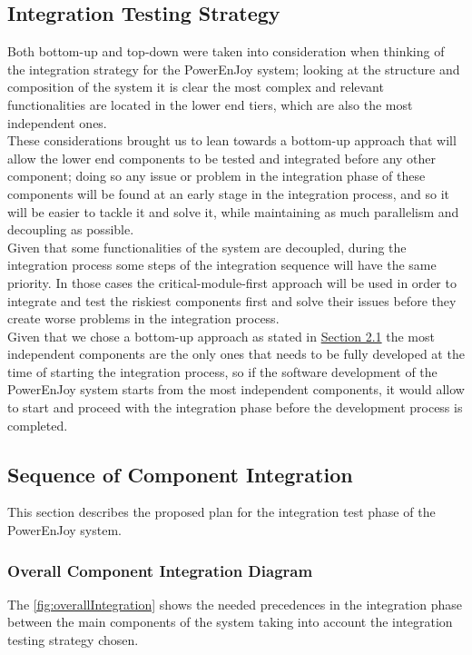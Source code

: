 \subsection{Integration Testing Strategy} \label{sec:intStrategy}
Both bottom-up and top-down were taken into consideration when thinking of the integration strategy for the PowerEnJoy system; looking at the structure and composition of the system it is clear the most complex and relevant functionalities are located in the lower end tiers, which are also the most independent ones.\\
These considerations brought us to lean towards a bottom-up approach that will allow the lower end components to be tested and integrated before any other component; doing so any issue or problem in the integration phase of these components will be found at an early stage in the integration process, and so it will be easier to tackle it and solve it, while maintaining as much parallelism and decoupling as possible.\\
Given that some functionalities of the system are decoupled, during the integration process some steps of the integration sequence will have the same priority. In those cases the critical-module-first approach will be used in order to integrate and test the riskiest  components first and solve their issues before they create worse problems in the integration process.\\
Given that we chose a bottom-up approach as stated in \hyperref[sec:entryCriteria]{Section 2.1} the most independent components are the only ones that needs to be fully developed at the time of starting the integration process, so if the software development of the PowerEnJoy system starts from the most independent components, it would allow to start and proceed with the integration phase before the development process is completed.

\subsection{Sequence of Component Integration}
This section describes the proposed plan for the integration test phase of the PowerEnJoy system.

\subsubsection{Overall Component Integration Diagram}  \label{sec:overallPrecedences}
The \autoref{fig:overallIntegration} shows the needed precedences in the integration phase between the main components of the system taking into account the integration testing strategy chosen.

